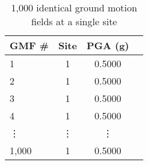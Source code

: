 \begin{table}[htbp]

\centering
\begin{tabular}{ l c c l }

\hline
\rowcolor{anti-flashwhite}
\bf{GMF \#} & \bf{Site} & \bf{PGA (g)}\\
\hline
1 & 1 & 0.5000 \\
2 & 1 & 0.5000 \\
3 & 1 & 0.5000 \\
4 & 1 & 0.5000 \\
\vdots & \vdots & \vdots \\
1,000 & 1 & 0.5000 \\
\hline
\end{tabular}

\caption{1,000 identical ground motion fields at a single site}
\label{tab:gmfs-iden-l1-1000}
\end{table}